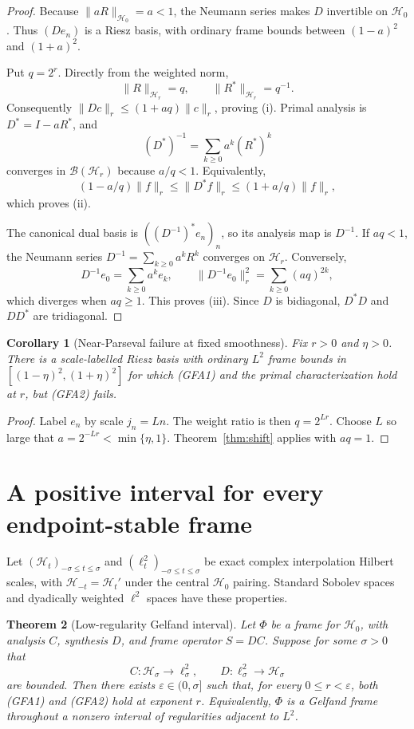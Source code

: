 \documentclass[11pt]{article}
\newtheorem{theorem}{Theorem}
\newtheorem{corollary}[theorem]{Corollary}
\begin{document}
\begin{proof}
Because $\|aR\|_{\mathcal H_0}=a<1$, the Neumann series makes $D$ invertible
on $\mathcal H_0$. Thus $(De_n)$ is a Riesz basis, with ordinary frame bounds
between $(1-a)^2$ and $(1+a)^2$.

Put $q=2^r$. Directly from the weighted norm,
\[
 \|R\|_{\mathcal H_r}=q,
 \qquad \|R^*\|_{\mathcal H_r}=q^{-1}.
\]
Consequently $\|Dc\|_r\leq(1+aq)\|c\|_r$, proving (i). Primal
analysis is $D^*=I-aR^*$, and
\[
 (D^*)^{-1}=\sum_{k\geq0}a^k(R^*)^k
\]
converges in $\mathcal B(\mathcal H_r)$ because $a/q<1$. Equivalently,
\[
 (1-a/q)\|f\|_r\leq\|D^*f\|_r
 \leq(1+a/q)\|f\|_r,
\]
which proves (ii).

The canonical dual basis is $((D^{-1})^*e_n)_n$, so its analysis map is
$D^{-1}$. If $aq<1$, the Neumann series
$D^{-1}=\sum_{k\geq0}a^kR^k$ converges on $\mathcal H_r$. Conversely,
\[
 D^{-1}e_0=\sum_{k\geq0}a^k e_k,
 \qquad
 \|D^{-1}e_0\|_r^2=\sum_{k\geq0}(aq)^{2k},
\]
which diverges when $aq\geq1$. This proves (iii). Since $D$ is bidiagonal,
$D^*D$ and $DD^*$ are tridiagonal.
\end{proof}

\begin{corollary}[Near-Parseval failure at fixed smoothness]
Fix $r>0$ and $\eta>0$. There is a scale-labelled Riesz basis with ordinary
$L^2$ frame bounds in $[(1-\eta)^2,(1+\eta)^2]$ for which (GFA1) and the
primal characterization hold at $r$, but (GFA2) fails.
\end{corollary}

\begin{proof}
Label $e_n$ by scale $j_n=Ln$. The weight ratio is then $q=2^{Lr}$.
Choose $L$ so large that $a=2^{-Lr}<\min\{\eta,1\}$. Theorem~\ref{thm:shift}
applies with $aq=1$.
\end{proof}

\section{A positive interval for every endpoint-stable frame}

Let $(\mathcal H_t)_{-\sigma\leq t\leq\sigma}$ and
$(\ell^2_t)_{-\sigma\leq t\leq\sigma}$ be exact complex interpolation
Hilbert scales, with $\mathcal H_{-t}=\mathcal H_t'$ under the central
$\mathcal H_0$ pairing. Standard Sobolev spaces and dyadically weighted
$\ell^2$ spaces have these properties.

\begin{theorem}[Low-regularity Gelfand interval]\label{thm:interval}
Let $\Phi$ be a frame for $\mathcal H_0$, with analysis $C$, synthesis $D$,
and frame operator $S=DC$. Suppose for some $\sigma>0$ that
\[
 C:\mathcal H_\sigma\to\ell^2_\sigma,
 \qquad D:\ell^2_\sigma\to\mathcal H_\sigma
\]
are bounded. Then there exists $\varepsilon\in(0,\sigma]$ such that, for
every $0\leq r<\varepsilon$, both (GFA1) and (GFA2) hold at exponent $r$.
Equivalently, $\Phi$ is a Gelfand frame throughout a nonzero interval of
regularities adjacent to $L^2$.
\end{theorem}
\end{document}
